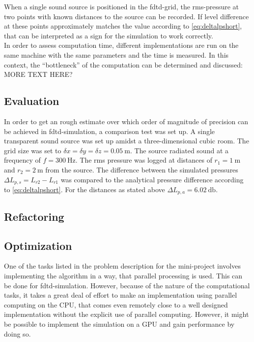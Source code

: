 When a single sound source is positioned in the \gls{fdtd}-grid, the \gls{rms}-pressure at two points with known distances to the source can be recorded. If level difference at these points approximately matches the value according to \autoref{eq:deltalpshort}, that can be interpreted as a sign for the simulation to work correctly.\\
In order to assess computation time, different implementations are run on the same machine with the same parameters and the time is measured. In this context, the ``bottleneck'' of the computation can be determined and discussed: MORE TEXT HERE?
\subsection{Evaluation}\label{ssec:evaluation}
In order to get an rough estimate over which order of magnitude of precision can be achieved in \gls{fdtd}-simulation, a comparison test was set up. A single transparent sound source was set up amidst a three-dimensional cubic room. The grid size was set to $\delta x=\delta y=\delta z = \SI{0.05}{\meter}$. The source radiated sound at a frequency of $f=\SI{300}{\hertz}$. The \gls{rms} pressure was logged at distances of $r_1=\SI{1}{\meter}$ and $r_2=\SI{2}{\meter}$ from the source. The difference between the simulated pressures $\Delta L_{p,s}=L_{r2}-L_{r1}$ was compared to the analytical pressure difference according to \autoref{eq:deltalpshort}. For the distances as stated above $\Delta L_{p,a}=\SI{6.02}{\decibel}$.\\

\subsection{Refactoring}\label{ssec:refactoring}
\subsection{Optimization}\label{ssec:optimization}
One of the tasks listed in the problem description for the mini-project involves implementing the algorithm in a way, that parallel processing is used. This can be done for \gls{fdtd}-simulation. However, because of the nature of the computational tasks, it takes a great deal of effort to make an implementation using parallel computing on the CPU, that comes even remotely close to a well designed implementation without the explicit use of parallel computing.
However, it might be possible to implement the simulation on a GPU and gain performance by doing so. 